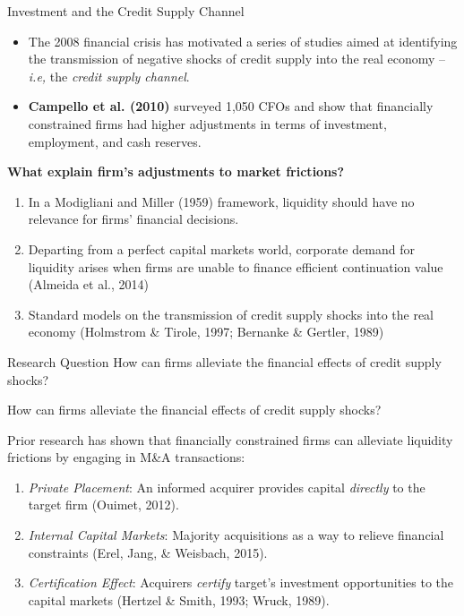 \documentclass[10pt]{beamer}
\begin{document}
\begin{frame}{Investment and the Credit Supply Channel}

\begin{itemize}
    \item The 2008 financial crisis has motivated a series of studies aimed at identifying the transmission of negative shocks of credit supply into the real economy – \textit{i.e,} the \textit{credit supply channel}. \pause
    
    \item \textbf{Campello et al. (2010)} surveyed 1,050 CFOs and show that financially constrained firms had higher adjustments in terms of investment, employment, and cash reserves. \pause
\end{itemize}
\vspace{3mm}
\textbf{What explain firm's adjustments to market frictions?}
\begin{enumerate}
    \item In a Modigliani and Miller (1959) framework, liquidity should have no relevance for firms’ financial decisions.
    \item Departing from a perfect capital markets world, corporate demand for liquidity arises when firms are unable to finance efficient continuation value (Almeida et al., 2014)
    \item Standard models on the transmission of credit supply shocks into the real economy (Holmstrom \& Tirole, 1997; Bernanke \& Gertler, 1989) \pause
\end{enumerate}
\begin{block}{Research Question}
How can firms alleviate the financial effects of credit supply shocks?
\end{block}
\end{frame}

\begin{frame}{How can firms alleviate the financial effects of credit supply shocks?}

Prior research has shown that financially constrained firms can alleviate liquidity frictions by engaging in M\&A transactions:

    \begin{enumerate}

        \item \textit{Private Placement}: An informed acquirer provides capital \textit{directly} to the target firm (Ouimet, 2012).
        
        \item \textit{Internal Capital Markets}: Majority acquisitions as a way to relieve financial constraints (Erel, Jang, \& Weisbach, 2015).
        
        \item \textit{Certification Effect}: Acquirers \textit{certify} target's investment opportunities to the capital markets (Hertzel \& Smith, 1993; Wruck, 1989).
    \end{enumerate}
\end{frame}
\end{document}
